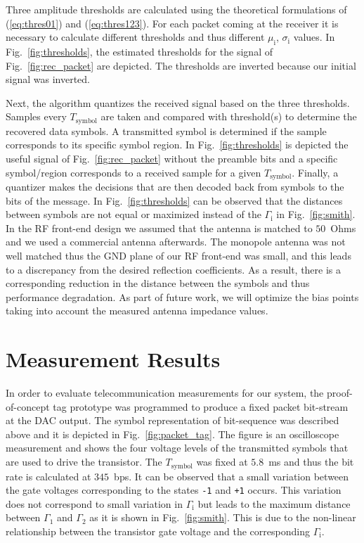 \documentclass[journal]{IEEEtran}
\begin{document}
%
Three amplitude thresholds are calculated using the theoretical  formulations of (\ref{eq:thres01}) and (\ref{eq:thres123}).
%
For each packet coming at the receiver it is necessary  to calculate different thresholds and thus  different $\mu_\text{i}$, $\sigma_\text{i}$ values.
%
In Fig.~\ref{fig:thresholds},  the estimated thresholds for the signal of Fig.~\ref{fig:rec_packet} are depicted. 
%
The thresholds are inverted because  our initial signal was inverted.
%

Next, the algorithm quantizes the received signal  based on  the three thresholds.
%
Samples every $T_\text{symbol}$ are taken and compared with threshold(s) to determine the recovered data symbols.
%
A  transmitted symbol  is determined  if  the sample corresponds to its specific symbol region.
%
In Fig.~\ref{fig:thresholds} is depicted the useful signal of Fig.~\ref{fig:rec_packet} without the preamble bits and a specific symbol/region corresponds to a received sample for a given $T_\text{symbol}$.
%
%
Finally, a quantizer makes the  decisions that are then
decoded back from symbols to the bits of the message.
%
In Fig.~\ref{fig:thresholds} can be  observed that
the distances between symbols are not equal or maximized instead of the $\Gamma_\text{i}$ in Fig.~\ref{fig:smith}.
% 
In the RF front-end design we assumed that the antenna is matched to $50$~Ohms and we used a commercial antenna afterwards. 
%
The monopole antenna was not well matched thus the GND plane of our RF front-end  was small, and this leads to a discrepancy from the desired reflection coefficients.
% 
As a result, there is a corresponding reduction in the distance between the symbols and thus performance degradation.
%
As part of future work, we will optimize the bias points taking into account the measured antenna impedance values.
%
\section{Measurement Results}
\label{Sec:Experimental}
%
In order to evaluate telecommunication measurements for our 
system, the proof-of-concept tag prototype  was programmed  to produce a fixed packet bit-stream   at the DAC output. 
%
The symbol representation of bit-sequence was described above and it is depicted in Fig.~\ref{fig:packet_tag}. 
%
The figure is an oscilloscope measurement and  shows the   four voltage levels of the transmitted symbols that are
used to drive the transistor. 
%
The  $T_\text{symbol}$ was fixed at $5.8$~ms and thus the bit rate is calculated at $345$~bps.
%
It can be observed that  a small
variation between the gate voltages corresponding to the states \texttt{-1} and \texttt{+1}  occurs.
%
This variation  does not correspond  to   small
variation in $\Gamma_\text{i}$ but leads to the maximum distance between
$\Gamma_\text{1}$ and $\Gamma_\text{2}$  as it is shown in Fig.~\ref{fig:smith}.
%
This is due to the non-linear relationship
between the transistor gate voltage and the corresponding $\Gamma_\text{i}$.
\end{document}
